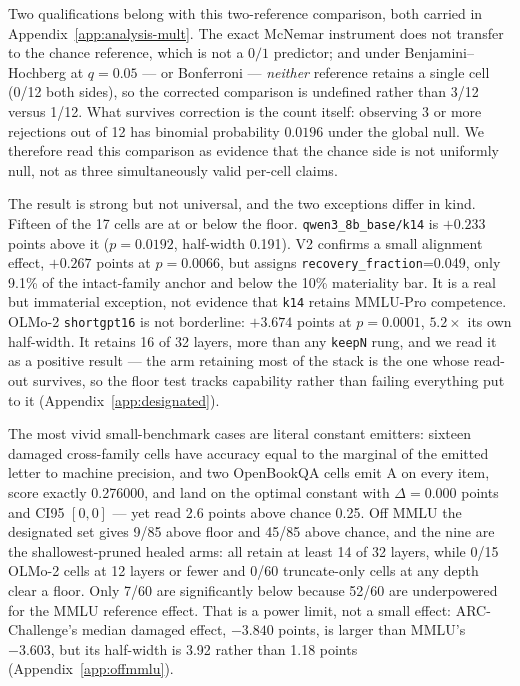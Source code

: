 Two qualifications belong with this two-reference comparison, both carried in Appendix~\ref{app:analysis-mult}. The exact McNemar instrument does not transfer to the chance reference, which is not a $0/1$ predictor; and under Benjamini--Hochberg at $q=0.05$ --- or Bonferroni --- \emph{neither} reference retains a single cell (0/12 both sides), so the corrected comparison is undefined rather than 3/12 versus 1/12. What survives correction is the count itself: observing 3 or more rejections out of 12 has binomial probability $0.0196$ under the global null. We therefore read this comparison as evidence that the chance side is not uniformly null, not as three simultaneously valid per-cell claims.

The result is strong but not universal, and the two exceptions differ in kind. Fifteen of the 17 cells are at or below the floor. \texttt{qwen3\_8b\_base/k14} is $+0.233$ points above it ($p=0.0192$, half-width 0.191). V2 confirms a small alignment effect, $+0.267$ points at $p=0.0066$, but assigns \texttt{recovery\_fraction}=0.049, only 9.1\% of the intact-family anchor and below the 10\% materiality bar. It is a real but immaterial exception, not evidence that \texttt{k14} retains MMLU-Pro competence. OLMo-2 \texttt{shortgpt16} is not borderline: $+3.674$ points at $p=0.0001$, $5.2\times$ its own half-width. It retains 16 of 32 layers, more than any \texttt{keepN} rung, and we read it as a positive result --- the arm retaining most of the stack is the one whose read-out survives, so the floor test tracks capability rather than failing everything put to it (Appendix~\ref{app:designated}).

The most vivid small-benchmark cases are literal constant emitters: sixteen damaged cross-family cells have accuracy equal to the marginal of the emitted letter to machine precision, and two OpenBookQA cells emit A on every item, score exactly 0.276000, and land on the optimal constant with $\Delta=0.000$ points and CI95 $[0,0]$ --- yet read 2.6 points above chance 0.25. Off MMLU the designated set gives 9/85 above floor and 45/85 above chance, and the nine are the shallowest-pruned healed arms: all retain at least 14 of 32 layers, while 0/15 OLMo-2 cells at 12 layers or fewer and 0/60 truncate-only cells at any depth clear a floor. Only 7/60 are significantly below because 52/60 are underpowered for the MMLU reference effect. That is a power limit, not a small effect: ARC-Challenge's median damaged effect, $-3.840$ points, is larger than MMLU's $-3.603$, but its half-width is 3.92 rather than 1.18 points (Appendix~\ref{app:offmmlu}).

